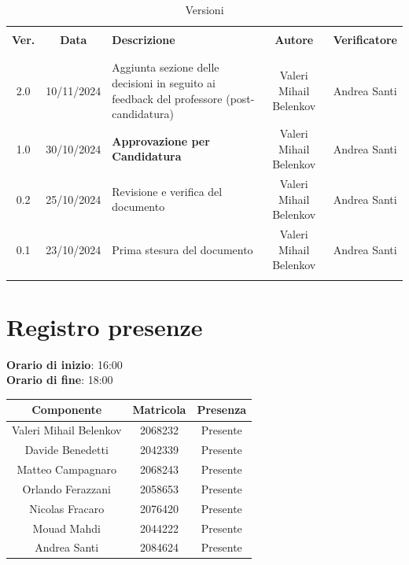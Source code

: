 \documentclass[italian, 12pt]{article}
\begin{document}
\pagestyle{mystyle}


\begin{table}[!h]
	\caption{Versioni}
	\begin{center}
		\begin{tabular}{ c c p{6.2cm} c c}
			\hline \\[-2ex]
			\textbf{Ver.} & \textbf{Data} & \textbf{Descrizione} & \textbf{Autore} & \textbf{Verificatore}\\
			\\[-2ex] \hline \\[-1.5ex]
            2.0 & 10/11/2024 & Aggiunta sezione delle decisioni in seguito ai feedback del professore (post-candidatura) & Valeri Mihail Belenkov & Andrea Santi\\
            1.0 & 30/10/2024 & \textbf{Approvazione per Candidatura} & Valeri Mihail Belenkov & Andrea Santi\\
            0.2 & 25/10/2024 & Revisione e verifica del documento & Valeri Mihail Belenkov & Andrea Santi\\
			0.1 & 23/10/2024 & Prima stesura del documento & Valeri Mihail Belenkov & Andrea Santi\\
			\\[-1.5ex] \hline
		\end{tabular}
	\end{center}
\end{table}


\tableofcontents
\newpage


\section{Registro presenze}

\textbf{Orario di inizio}: 16:00\\
\textbf{Orario di fine}: 18:00\\


\begin{flushleft}
	\begin{table}[!h]
	\begin{tabular}{ |c|c|c| } 
		\hline
		\textbf{Componente} & \textbf{Matricola} & \textbf{Presenza} \\
  \hline 
		Valeri Mihail Belenkov & 2068232 & Presente \\
		Davide Benedetti 	& 2042339 & Presente \\
		Matteo Campagnaro	& 2068243 & Presente \\
		Orlando Ferazzani 	& 2058653 & Presente \\
		Nicolas Fracaro 	& 2076420 & Presente \\
		Mouad Mahdi		    & 2044222 & Presente \\ 
		Andrea Santi 	    & 2084624 & Presente \\
		\hline
	\end{tabular}
	\end{table}
	\end{flushleft}
\end{document}
